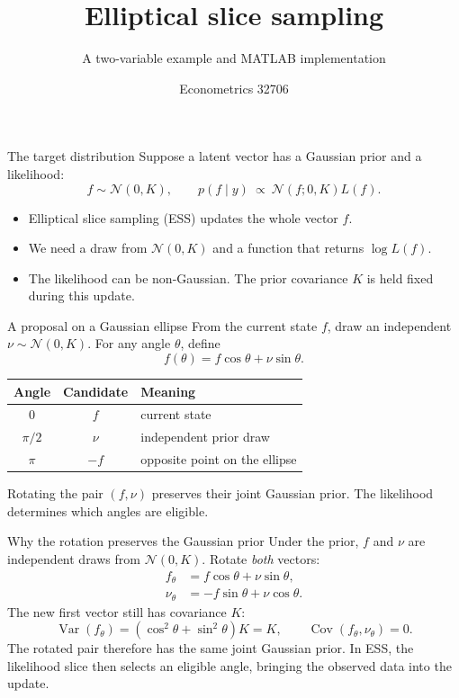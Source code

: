 \documentclass[aspectratio=169,11pt]{beamer}
\title{Elliptical slice sampling}
\subtitle{A two-variable example and MATLAB implementation}
\author{Econometrics 32706}
\date{}
\begin{document}
\begin{frame}
  \titlepage
\end{frame}

\begin{frame}{The target distribution}
  Suppose a latent vector has a Gaussian prior and a likelihood:
  \[
    f\sim\mathcal N(0,K),
    \qquad
    p(f\mid y)\ \propto\ \mathcal N(f;0,K)L(f).
  \]
  \begin{itemize}
    \item Elliptical slice sampling (ESS) updates the whole vector \(f\).
    \item We need a draw from \(\mathcal N(0,K)\) and a function that returns
          \(\log L(f)\).
    \item The likelihood can be non-Gaussian. The prior covariance \(K\) is
          held fixed during this update.
  \end{itemize}
\end{frame}

\begin{frame}{A proposal on a Gaussian ellipse}
  From the current state \(f\), draw an independent
  \(\nu\sim\mathcal N(0,K)\). For any angle \(\theta\), define
  \[
    f(\theta)=f\cos\theta+\nu\sin\theta.
  \]
  \begin{center}
    \begin{tabular}{@{}ccl@{}}
      \toprule
      Angle & Candidate & Meaning\\
      \midrule
      \(0\) & \(f\) & current state\\
      \(\pi/2\) & \(\nu\) & independent prior draw\\
      \(\pi\) & \(-f\) & opposite point on the ellipse\\
      \bottomrule
    \end{tabular}
  \end{center}
  Rotating the pair \((f,\nu)\) preserves their joint Gaussian prior.
  The likelihood determines which angles are eligible.
\end{frame}

\begin{frame}{Why the rotation preserves the Gaussian prior}
  Under the prior, \(f\) and \(\nu\) are independent draws from
  \(\mathcal N(0,K)\). Rotate \emph{both} vectors:
  \[
    \begin{aligned}
      f_\theta   &= f\cos\theta+\nu\sin\theta,\\
      \nu_\theta &= -f\sin\theta+\nu\cos\theta.
    \end{aligned}
  \]
  The new first vector still has covariance \(K\):
  \[
    \operatorname{Var}(f_\theta)
      =(\cos^2\theta+\sin^2\theta)K=K,
    \qquad
    \operatorname{Cov}(f_\theta,\nu_\theta)=0.
  \]
  The rotated pair therefore has the same joint Gaussian prior.
  In ESS, the likelihood slice then selects an eligible angle, bringing
  the observed data into the update.
\end{frame}
\end{document}

